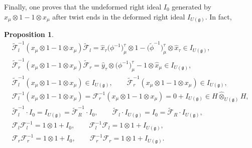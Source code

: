 \documentclass[pdftex]{sigma}
\def\gg{\mathfrak{g}}
\def\hx{\hat{x}}
\def\hy{\hat{y}}
\newtheorem{Proposition}[Theorem]{Proposition}
 { \theoremstyle{definition}
\newtheorem{Definition}[Theorem]{Definition}
\newtheorem{Example}[Theorem]{Example}
\newtheorem{Remark}[Theorem]{Remark} }
\numberwithin{equation}{section}
\begin{document}
Finally, one proves that the undeformed right ideal $I_0$ generated by $x_\mu\otimes 1 - 1\otimes x_\mu$ after twist ends in the deformed right ideal $I_{U(\gg)}$. In fact,
\begin{Proposition}\label{prop:ideal}
\begin{gather*}
\tilde{\mathcal{F}}_l^{-1}(x_\mu\otimes 1-1\otimes x_\mu)\tilde{\mathcal{F}}_l =
\hat{x}_\tau\big(\phi^{-1}\big)^\tau_\mu\otimes 1 - \big(\tilde\phi^{-1}\big)^\tau_\mu\otimes\hat{x}_\tau\in I_{U(\gg)},
\\
\tilde{\mathcal{F}}_r^{-1}(x_\mu\otimes 1-1\otimes x_\mu)
\tilde{\mathcal{F}}_r =\hy_\tau\otimes\big(\phi^{-1}\big)^\tau_\mu- 1\otimes\hx_\mu \in I_{U(\gg)},
\\
\tilde{\mathcal{F}}_l^{-1}(x_\mu\otimes 1-1\otimes x_\mu)\in I_{U(\gg)},\qquad
\tilde{\mathcal{F}}_r^{-1}(x_\mu\otimes 1-1\otimes x_\mu)\in I_{U(\gg)},
\\
\mathcal{F}_l^{-1}(x_\mu\otimes 1-1\otimes x_\mu) =
\mathcal{F}_r^{-1}(x_\mu\otimes 1-1\otimes x_\mu) = 0 + I_{U(\gg)}
\in H\hat\otimes_{U(\gg)} H,
\\
\tilde{\mathcal{F}}_l^{-1}\cdot I_0 = I_{U(\gg)} = \tilde{\mathcal{F}}_R^{-1}\cdot I_0,
\qquad
\tilde{\mathcal{F}}_l\cdot I_{U(\gg)} = I_0 = \tilde{\mathcal{F}}_R \cdot I_{U(\gg)},
\\
\mathcal{F}_l\mathcal{F}_l^{-1} = 1\otimes 1 + I_0,\qquad
\mathcal{F}_l^{-1}\mathcal{F}_l = 1\otimes 1 + I_{U(\gg)},
\\
\mathcal{F}_r\mathcal{F}_r^{-1} = 1\otimes 1 + I_0,\qquad
\mathcal{F}_r^{-1}\mathcal{F}_r = 1\otimes 1 + I_{U(\gg)}.
\end{gather*}
\end{Proposition}
\end{document}
